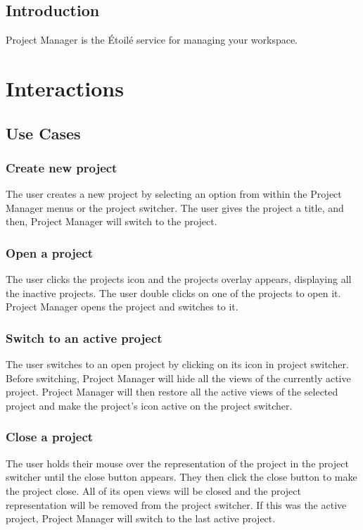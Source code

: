 \documentclass[11pt]{report}
\newcommand{\etoile}{\'Etoil\'e\xspace}
\newcommand{\proman}{Project Manager\xspace}
\begin{document}
\section{Introduction}
Project Manager is the \etoile service for managing your workspace.

\chapter{Interactions}
\section{Use Cases}

\subsection{Create new project}
The user creates a new project by selecting an option from within the \proman menus or the project switcher. The user gives the project a title, and then, \proman will switch to the project.

\subsection{Open a project}
The user clicks the projects icon and the projects overlay appears, displaying all the inactive projects. The user double clicks on one of the projects to open it. \proman opens the project and switches to it.

\subsection{Switch to an active project}
The user switches to an open project by clicking on its icon in project switcher. Before switching, \proman will hide all the views of the currently active project. \proman will then restore all the active views of the selected project and make the project's icon active on the project switcher.

\subsection{Close a project}
The user holds their mouse over the representation of the project in the project switcher until the close button appears. They then click the close button to make the project close. All of its open views will be closed and the project representation will be removed from the project switcher. If this was the active project, \proman will switch to the last active project.
\end{document}
